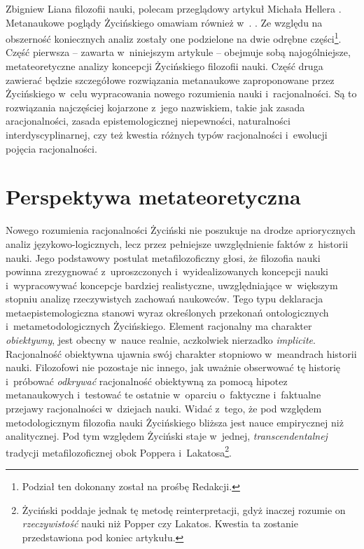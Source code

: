 \begin{artplenv}{Zbigniew Liana}
{filozofii nauki, polecam przeglądowy artykuł Michała Hellera
\parencite*{heller_filozoficzny_2011}.
Metanaukowe poglądy Życińskiego omawiam również w~\parencite{evers_can_2016}.
}. Ze względu na obszerność koniecznych analiz zostały one podzielone na dwie odrębne części\footnote{\label{lia-foo-5}Podział ten
dokonany został na prośbę Redakcji.}. Część pierwsza -- zawarta w~niniejszym artykule -- obejmuje sobą najogólniejsze,
metateoretyczne analizy koncepcji Życińskiego filozofii nauki. Część druga zawierać będzie szczegółowe rozwiązania
metanaukowe zaproponowane przez Życińskiego w~celu wypracowania nowego rozumienia nauki i~racjonalności. Są to
rozwiązania najczęściej kojarzone z~jego nazwiskiem, takie jak zasada aracjonalności, zasada epistemologicznej
niepewności, naturalności interdyscyplinarnej, czy też kwestia różnych typów racjonalności i~ewolucji pojęcia
racjonalności.

\section{Perspektywa metateoretyczna}

Nowego rozumienia racjonalności Życiński nie poszukuje na drodze apriorycznych analiz językowo-logicznych, lecz przez
pełniejsze uwzględnienie faktów z~historii nauki. Jego podstawowy postulat metafilozoficzny głosi, że filozofia nauki
powinna zrezygnować z~uproszczonych i~wyidealizowanych koncepcji nauki i~wypracowywać koncepcje bardziej realistyczne,
uwzględniające w~większym stopniu analizę rzeczywistych zachowań naukowców. Tego typu deklaracja metaepistemologiczna
stanowi wyraz określonych przekonań ontologicznych i~metametodologicznych Życińskiego. Element racjonalny ma charakter
\textit{obiektywny}, jest obecny w~nauce realnie, aczkolwiek nierzadko \textit{implicite}. Racjonalność obiektywna ujawnia
swój charakter stopniowo w~meandrach historii nauki. Filozofowi nie pozostaje nic innego, jak uważnie obserwować tę
historię i~próbować \textit{odkrywać }racjonalność obiektywną za pomocą hipotez metanaukowych i~testować te
ostatnie w~oparciu o~faktyczne i~faktualne przejawy racjonalności w~dziejach nauki. Widać z~tego, że pod względem metodologicznym
filozofia nauki Życińskiego bliższa jest nauce empirycznej niż analitycznej. Pod tym względem Życiński staje w~jednej,
\textit{transcendentalnej} tradycji metafilozoficznej obok Poppera i~Lakatosa\footnote{Życiński poddaje jednak tę metodę
reinterpretacji, gdyż inaczej rozumie on \textit{rzeczywistość} nauki niż Popper czy Lakatos. Kwestia ta zostanie
przedstawiona pod koniec artykułu.}.


\end{artplenv}
